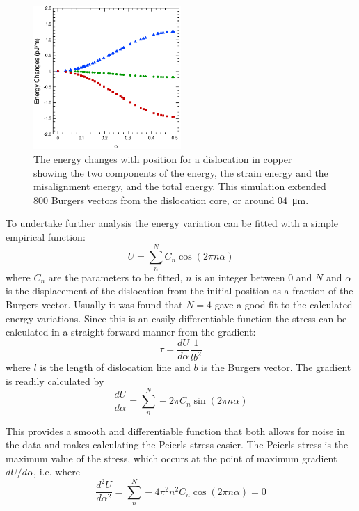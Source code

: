 \begin{figure}
\centering
\includegraphics[width=0.5\textwidth]{Copper_800_rel_energies}
\caption[The energy changes with dislocation position for  copper.]{The energy changes with position for a dislocation in copper showing the two components of the energy, the strain energy and the misalignment energy, and the total energy. This simulation extended \num{800} Burgers vectors from the dislocation core, or around \SI{04}{\micro\meter}.\label{fig:copper_800_rel_energies}}
\end{figure}




To undertake further analysis the energy variation can be fitted with a simple empirical function:
\begin{equation}
U = \sum^N_n C_n \cos (2 \pi n \alpha) \label{eqn:empirical_function}
\end{equation}
where $C_n$ are the parameters to be fitted, $n$ is an integer between $0$ and $N$ and $\alpha$ is the displacement of the dislocation from the initial position as a fraction of the Burgers vector. Usually it was found that $N=4$ gave a good fit to the calculated energy variations. Since this is an easily differentiable function the stress can be calculated in a straight forward manner from the gradient:
\begin{equation}
\tau = \frac{dU}{d\alpha} \frac{1}{lb^2}
\end{equation}
where $l$ is the length of dislocation line and $b$ is the Burgers vector. The gradient is readily calculated by
\begin{equation}
\frac{dU}{d\alpha} = \sum_n^N - 2 \pi C_n \sin ( 2 \pi n \alpha )
\end{equation}

This provides a smooth and differentiable function that both allows for noise in the data and makes calculating the Peierls stress easier. The Peierls stress is the maximum value of the stress, which occurs at the point of maximum gradient $dU/d\alpha$, i.e. where
\begin{equation}
\frac{d^2U}{d\alpha^2} = \sum_n^N -4 \pi^2 n^2 C_n \cos ( 2 \pi n \alpha ) = 0
\end{equation}

